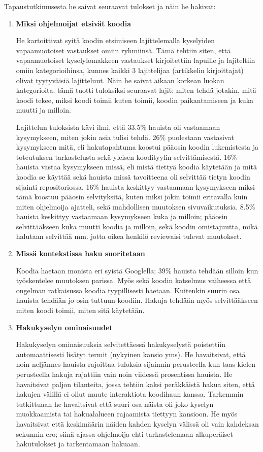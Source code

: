 \documentclass[finnish]{../tktltiki2}
\theoremstyle{definition}
\theoremstyle{remark}
\begin{document}
Tapaustutkimusesta he saivat seuraavat tulokset ja näin he hakivat:
\begin{enumerate}

  \item {\bf Miksi ohjelmoijat etsivät koodia}

    He kartoittivat syitä koodin etsimiseen lajittelemalla kyselyiden vapaamuotoiset vastaukset omiin ryhmiinsä. Tämä tehtiin siten, että vapaamuotoiset kyselylomakkeen vastaukset kirjoitettiin lapuille ja lajiteltiin omiin kategorioihinsa, kunnes kaikki 3 lajittelijaa (artikkelin kirjoittajat) olivat tyytyväisiä lajitteluut. Näin he saivat aikaan korkean luokan kategorioita.
    tämä tuotti tuloksiksi seuraavat lajit: miten tehdä jotakin, mitä koodi tekee, miksi koodi toimii kuten toimii, koodin paikantamiseen ja kuka muutti ja milloin.

  Lajittelun tuloksista kävi ilmi, että 33.5\% hauista oli vastaamaan kysymykseen, miten jokin asia tulisi tehdä. 26\% puolestaan vastasivat kysymykseen mitä, eli hakutapahtuma koostui pääosin koodin lukemistesta ja toteutuksen tarkastelusta sekä yleisen koodityylin selvittämisestä. 16\% hauista vastaa kysymykseen missä, eli mistä tiettyä koodia käytetään ja mitä koodia se käyttää sekä hauista missä tavoitteena oli selvittää tietyn koodin sijainti repositoriossa. 16\% hauista keskittyy vastaamaan kysymykseen miksi tämä koostuu pääosin selvityksitä, kuten miksi jokin toimii eritavalla kuin miten ohjelmoija ajatteli, sekä mahdollisen muutoksen sivuvaikutuksia. 8.5\% hauista keskittyy vastaamaan kysymykseen kuka ja milloin; pääosin selvittääkseen kuka muutti koodia ja milloin, sekä koodin omistajuutta, mikä halutaan selvittää mm. jotta oikea henkilö reviewaisi tulevat muutokset.

  \item {\bf Missä kontekstissa haku suoritetaan}

    Koodia haetaan monista eri syistä Googlella; 39\% hauista tehdään silloin kun työskentelee muutoksen parissa. Myös sekä koodin katselmus vaiheessa että ongelman ratkaisussa koodia tyypillisesti haetaan. Kuitenkin suurin osa hauista tehdään jo osin tuttuun koodiin. Hakuja tehdään myös selvittääkseen miten koodi toimii, miten sitä käytetään.

  \item {\bf Hakukyselyn ominaisuudet}

    Hakukyselyn ominaisuuksia selvitettäessä hakukyselystä poistettiin automaattisesti lisätyt termit (nykyinen kansio yms). He havaitsivat, että noin neljännes hauista rajoittaa tuloksia sijainnin perusteella kun taas kielen perusteella hakuja rajattiin vain noin viidessä prosentissa hauista.
    He havaitsivat paljon tilanteita, jossa tehtiin kaksi peräkkäistä hakua siten, että hakujen välillä ei ollut muute interaktiota koodihaun kanssa. Tarkemmin tutkittuaan he havaitsivat että suuri osa näista oli joko kyselyn muokkaamista tai hakualalueen rajaamista tiettyyn kansioon. He myös havaitsivat että keskimäärin näiden kahden kyselyn välissä oli vain kahdeksan sekunnin ero; siinä ajassa ohjelmoija ehti tarkastelemaan alkuperäiset hakutulokset ja tarkentamaan hakuaan.


\end{enumerate}
\end{document}
